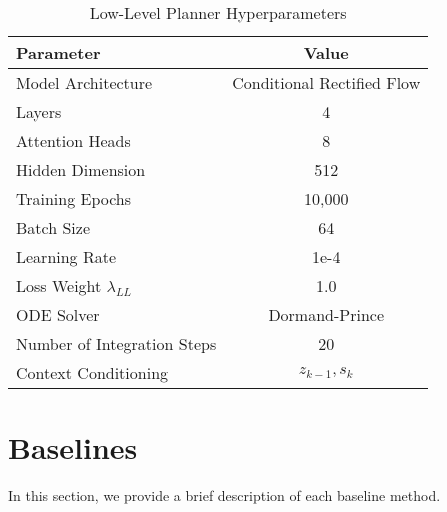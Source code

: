 \documentclass{article} %
\begin{document}
\begin{table}[htp]
    \centering
    \label{tab:low_level_planner_hyperparameters}
    \begin{tabular}{lc}
        \toprule
        \textbf{Parameter} & \textbf{Value} \\
        \midrule
        Model Architecture & Conditional Rectified Flow \\
        Layers & 4 \\
        Attention Heads & 8 \\
        Hidden Dimension & 512 \\
        Training Epochs & 10,000 \\
        Batch Size & 64 \\
        Learning Rate & 1e-4 \\
        Loss Weight $\lambda_{LL}$ & 1.0 \\
        ODE Solver & Dormand-Prince \\
        Number of Integration Steps & 20 \\
        Context Conditioning & $z_{k-1}, s_k$ \\
        \bottomrule
    \end{tabular}
    \caption{Low-Level Planner Hyperparameters}
\end{table}

\newpage
\section{Baselines}
\label{app:baselines}
In this section, we provide a brief description of each baseline method.
\end{document}
